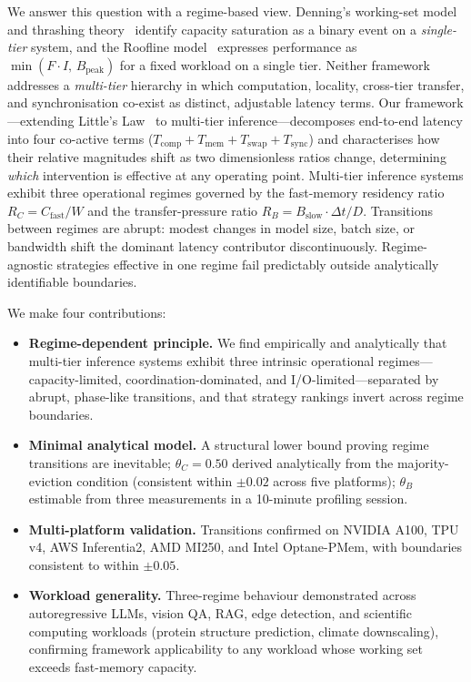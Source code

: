We answer this question with a regime-based view.
Denning's working-set model and thrashing theory~\cite{mattson1970evaluation}
identify capacity saturation as a binary event on a \emph{single-tier} system,
and the Roofline model~\cite{williams2009roofline} expresses performance as
$\min(F \cdot I,\, B_{\mathrm{peak}})$ for a fixed workload on a single tier.
Neither framework addresses a \emph{multi-tier} hierarchy in which computation,
locality, cross-tier transfer, and synchronisation co-exist as distinct,
adjustable latency terms.
Our framework---extending Little's Law~\cite{kleinrock1975queueing} to multi-tier
inference---decomposes end-to-end latency into four co-active terms
($T_{\mathrm{comp}} + T_{\mathrm{mem}} + T_{\mathrm{swap}} + T_{\mathrm{sync}}$)
and characterises how their relative magnitudes shift as two dimensionless
ratios change, determining \emph{which} intervention is effective at any
operating point.
Multi-tier inference systems exhibit three operational regimes governed by the
fast-memory residency ratio $R_C = C_{\mathrm{fast}}/W$ and the
transfer-pressure ratio $R_B = B_{\mathrm{slow}} \cdot \Delta t / D$.
Transitions between regimes are abrupt: modest changes in model size, batch
size, or bandwidth shift the dominant latency contributor discontinuously.
Regime-agnostic strategies effective in one regime fail predictably outside
analytically identifiable boundaries.

We make four contributions:
\begin{itemize}
  \item \textbf{Regime-dependent principle.}
    We find empirically and analytically that multi-tier inference systems
    exhibit three intrinsic operational regimes---capacity-limited,
    coordination-dominated, and I/O-limited---separated by abrupt,
    phase-like transitions, and that strategy rankings invert across
    regime boundaries.
  \item \textbf{Minimal analytical model.}
    A structural lower bound proving regime transitions are inevitable;
    $\theta_C = 0.50$ derived analytically from the majority-eviction condition
    (consistent within $\pm 0.02$ across five platforms);
    $\theta_B$ estimable from three measurements in a 10-minute profiling session.
  \item \textbf{Multi-platform validation.}
    Transitions confirmed on NVIDIA A100, TPU v4, AWS Inferentia2, AMD MI250,
    and Intel Optane-PMem, with boundaries consistent to within $\pm 0.05$.
  \item \textbf{Workload generality.}
    Three-regime behaviour demonstrated across autoregressive LLMs, vision QA,
    RAG, edge detection, and scientific computing workloads (protein structure
    prediction, climate downscaling), confirming framework applicability to any
    workload whose working set exceeds fast-memory capacity.
\end{itemize}

